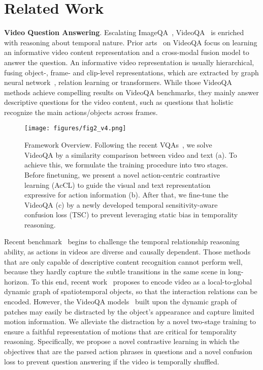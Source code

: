 \documentclass[sigconf]{acmart}
\begin{document}
 \section{Related Work}
\textbf{Video Question Answering}. 
Escalating ImageQA~\cite{antol2015vqa}, VideoQA~\cite{xu2016msr,yu2019activitynet,li2016tgif,xiao2021next,li2022representation,lei2018tvqa} is enriched with reasoning about temporal nature. Prior arts~\cite{le2020hierarchical,park2021bridge,xiao2022hqga} on VideoQA focus on learning an informative video content representation and a cross-modal fusion model to answer the question. An informative video representation is usually hierarchical, fusing object-, frame- and clip-level representations, which are extracted by graph neural network~\cite{jiang2020reasoning, li2022invariant,park2021bridge}, relation learning or transformers. While those VideoQA methods achieve compelling results on VideoQA benchmarks, they mainly answer descriptive questions for the video content, such as questions that holistic recognize the main actions/objects across frames. 




\begin{figure*}
    \centering
    \texttt{[image: figures/fig2\_v4.png]}
    \caption{Framework Overview. Following the recent VQAs~\cite{xiao2022vgt, yang2021just}, we solve VideoQA by a similarity comparison between video and text (a). To achieve this, we formulate the training procedure into two stages. Before finetuning, we present a novel action-centric
contrastive learning (AcCL) to guide the visual and text representation expressive for action information (b). After that, we fine-tune the VideoQA (c) by a newly developed temporal sensitivity-aware confusion loss (TSC) to prevent leveraging static bias in temporality reasoning. }
    \label{fig:overview}
\end{figure*}



Recent benchmark~\cite{xiao2021next} begins to challenge the temporal relationship reasoning ability, as actions in videos are diverse and causally dependent. Those methods that are only capable of descriptive content recognition cannot perform well, because they hardly capture the subtle transitions in the same scene in long-horizon. To this end, recent work~\cite{xiao2022hqga, xiao2022vgt} proposes to encode video as a local-to-global dynamic graph of spatiotemporal objects, so that the interaction relations can be encoded. However, the VideoQA models~\cite{xiao2022hqga, xiao2022vgt,gao2023mist} built upon the dynamic graph of patches may easily be distracted by the object's appearance and capture limited motion information. 
We alleviate the distraction by a novel two-stage training to ensure a faithful representation of motions that are critical for temporality reasoning. Specifically, we propose a novel contrastive learning in which the objectives that are the parsed action phrases in questions and a novel confusion loss to prevent question answering if the video is temporally shuffled. 
\end{document}
